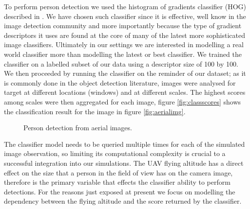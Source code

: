 \documentclass[a4paper,11pt]{report}
\begin{document}
To perform person detection we used the histogram of gradients classifier (HOG) described in \cite{dalal2005}. 
We have chosen such classifier since it is effective, well know in the image detection community and more importantly because the type of gradient descriptors it uses are found at the core of many of the latest more sophisticated image classifiers. 
Ultimately in our settings we are interested in modelling a real world classifier more than modelling the latest or best classifier. 
We trained the classifier on a labelled subset of our data using a descriptor size of 100 by 100. We then proceeded by running the classifier on the reminder of our dataset; as it is commonly done in the object detection literature, images were analysed for target at different locations (windows) and at different scales. The highest scores among scales were then aggregated for each image, figure \ref{fig:classscores} shows the classification result for the image in figure \ref{fig:aerialimg}.
\begin{figure}[ht]
\centering
{}
\caption{Person detection from aerial images.\label{fig:persdetect}}
\end{figure}

The classifier model needs to be queried multiple times for each of the simulated image observation, so limiting its computational complexity is crucial to a successful integration into our simulations.
The UAV flying altitude has a direct effect on the size that a person in the field of view has on the camera image, therefore is the primary variable that effects the classifier ability to perform detections.
For the reasons just exposed at present we focus on modelling the dependency between the flying altitude and the score returned by the classifier.
\end{document}
